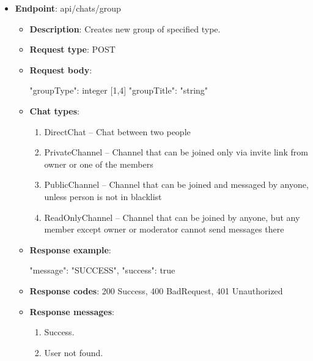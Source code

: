 \begin{itemize}
    \item \textbf{Endpoint}: api/chats/group
    \begin{itemize}
        \item \textbf{Description}: Creates new group of specified type.
        \item \textbf{Request type}: POST
        \item \textbf{Request body}:
        \begin{spverbatim}
        {
            "groupType": integer [1,4]
            "groupTitle": "string"
        }
        \end{spverbatim}
        \item \textbf{Chat types}:
        \begin{enumerate}
            \item DirectChat -- Chat between two people
            \item PrivateChannel -- Channel that can be joined only via invite link from owner or one of the members
            \item PublicChannel -- Channel that can be joined and messaged by anyone, unless person is not in blacklist
            \item ReadOnlyChannel -- Channel that can be joined by anyone, but any member except owner or moderator cannot send messages there
        \end{enumerate}
        \item \textbf{Response example}:
        \begin{spverbatim}
        {
            "message": "SUCCESS",
            "success": true
        }
        \end{spverbatim}
        \item \textbf{Response codes}: 200 Success, 400 BadRequest, 401 Unauthorized
        \item \textbf{Response messages}:
        \begin{enumerate}
            \item Success.
            \item User not found.
        \end{enumerate}
    \end{itemize}


\end{itemize}
